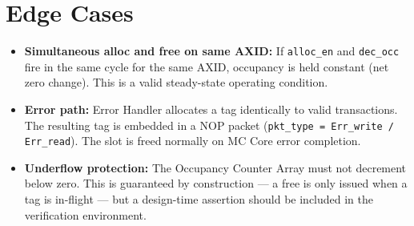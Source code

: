 \documentclass[11pt,a4paper]{article}
\begin{document}
\section{Edge Cases}

\begin{itemize}
  \item \textbf{Simultaneous alloc and free on same AXID:} If
        \texttt{alloc\_en} and \texttt{dec\_occ} fire in the same cycle
        for the same AXID, occupancy is held constant (net zero change).
        This is a valid steady-state operating condition.
  \item \textbf{Error path:} Error Handler allocates a tag identically
        to valid transactions. The resulting tag is embedded in a NOP
        packet (\texttt{pkt\_type = Err\_write / Err\_read}). The slot
        is freed normally on MC Core error completion.
  \item \textbf{Underflow protection:} The Occupancy Counter Array must
        not decrement below zero. This is guaranteed by construction —
        a free is only issued when a tag is in-flight — but a
        design-time assertion should be included in the verification
        environment.
\end{itemize}
\end{document}

